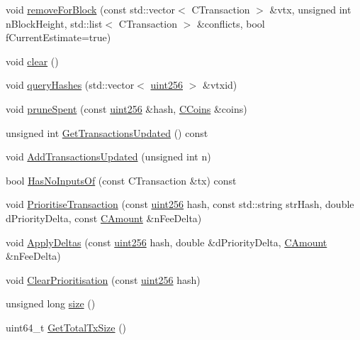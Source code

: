 \begin{DoxyCompactItemize}
\item 
void \mbox{\hyperlink{class_c_tx_mem_pool_aea14d073b24e31251465ac3c2279ee65}{remove\+For\+Block}} (const std\+::vector$<$ C\+Transaction $>$ \&vtx, unsigned int n\+Block\+Height, std\+::list$<$ C\+Transaction $>$ \&conflicts, bool f\+Current\+Estimate=true)
\item 
void \mbox{\hyperlink{class_c_tx_mem_pool_a6dba6bce4139392751321438a29b6b09}{clear}} ()
\item 
void \mbox{\hyperlink{class_c_tx_mem_pool_a42fa7d41a45562d02e356f2e7708bb02}{query\+Hashes}} (std\+::vector$<$ \mbox{\hyperlink{classuint256}{uint256}} $>$ \&vtxid)
\item 
void \mbox{\hyperlink{class_c_tx_mem_pool_ad6142b7cd3a58dae6cdaf03551c2f989}{prune\+Spent}} (const \mbox{\hyperlink{classuint256}{uint256}} \&hash, \mbox{\hyperlink{class_c_coins}{C\+Coins}} \&coins)
\item 
unsigned int \mbox{\hyperlink{class_c_tx_mem_pool_afd2a709a0e6cb34a57ff2f9fd0774e6c}{Get\+Transactions\+Updated}} () const
\item 
void \mbox{\hyperlink{class_c_tx_mem_pool_a3039b67e5eebaa3ff830261c192816f2}{Add\+Transactions\+Updated}} (unsigned int n)
\item 
bool \mbox{\hyperlink{class_c_tx_mem_pool_a7a5b17b8cf4560cd681ef035880e3245}{Has\+No\+Inputs\+Of}} (const C\+Transaction \&tx) const
\item 
void \mbox{\hyperlink{class_c_tx_mem_pool_a1a0a00279c941051af1b74c5ebeac40d}{Prioritise\+Transaction}} (const \mbox{\hyperlink{classuint256}{uint256}} hash, const std\+::string str\+Hash, double d\+Priority\+Delta, const \mbox{\hyperlink{amount_8h_a4eaf3a5239714d8c45b851527f7cb564}{C\+Amount}} \&n\+Fee\+Delta)
\item 
void \mbox{\hyperlink{class_c_tx_mem_pool_aa73d1d5a211150fe169d73dc25ba3cdd}{Apply\+Deltas}} (const \mbox{\hyperlink{classuint256}{uint256}} hash, double \&d\+Priority\+Delta, \mbox{\hyperlink{amount_8h_a4eaf3a5239714d8c45b851527f7cb564}{C\+Amount}} \&n\+Fee\+Delta)
\item 
void \mbox{\hyperlink{class_c_tx_mem_pool_a11dea05121ab8321e1d1f1a21ec5c9ac}{Clear\+Prioritisation}} (const \mbox{\hyperlink{classuint256}{uint256}} hash)
\item 
unsigned long \mbox{\hyperlink{class_c_tx_mem_pool_a867f7b452141770f3b2e8697fb3513d8}{size}} ()
\item 
uint64\+\_\+t \mbox{\hyperlink{class_c_tx_mem_pool_ad388f6544c2ca90f1550b06d9d86d54f}{Get\+Total\+Tx\+Size}} ()
\item 

\end{DoxyCompactItemize}
